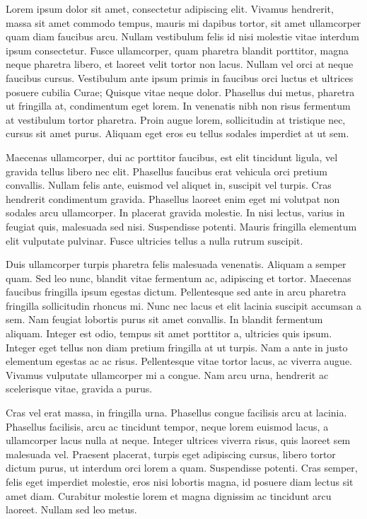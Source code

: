\documentclass[12pt,a4paper]{article}
\begin{document}
Lorem ipsum dolor sit amet, consectetur adipiscing elit. Vivamus
hendrerit, massa sit amet commodo tempus, mauris mi dapibus tortor,
sit amet ullamcorper quam diam faucibus arcu. Nullam vestibulum felis
id nisi molestie vitae interdum ipsum consectetur. Fusce ullamcorper,
quam pharetra blandit porttitor, magna neque pharetra libero, et
laoreet velit tortor non lacus. Nullam vel orci at neque faucibus
cursus. Vestibulum ante ipsum primis in faucibus orci luctus et
ultrices posuere cubilia Curae; Quisque vitae neque dolor. Phasellus
dui metus, pharetra ut fringilla at, condimentum eget lorem. In
venenatis nibh non risus fermentum at vestibulum tortor pharetra.
Proin augue lorem, sollicitudin at tristique nec, cursus sit amet
purus. Aliquam eget eros eu tellus sodales imperdiet at ut sem.


Maecenas ullamcorper, dui ac porttitor faucibus, est elit tincidunt
ligula, vel gravida tellus libero nec elit. Phasellus faucibus erat
vehicula orci pretium convallis. Nullam felis ante, euismod vel
aliquet in, suscipit vel turpis. Cras hendrerit condimentum gravida.
Phasellus laoreet enim eget mi volutpat non sodales arcu ullamcorper.
In placerat gravida molestie. In nisi lectus, varius in feugiat quis,
malesuada sed nisi. Suspendisse potenti. Mauris fringilla elementum
elit vulputate pulvinar. Fusce ultricies tellus a nulla rutrum
suscipit.


Duis ullamcorper turpis pharetra felis malesuada venenatis. Aliquam a
semper quam. Sed leo nunc, blandit vitae fermentum ac, adipiscing et
tortor. Maecenas faucibus fringilla ipsum egestas dictum.
Pellentesque sed ante in arcu pharetra fringilla sollicitudin rhoncus
mi. Nunc nec lacus et elit lacinia suscipit accumsan a sem. Nam
feugiat lobortis purus sit amet convallis. In blandit fermentum
aliquam. Integer est odio, tempus sit amet porttitor a, ultricies
quis ipsum. Integer eget tellus non diam pretium fringilla at ut
turpis. Nam a ante in justo elementum egestas ac ac risus.
Pellentesque vitae tortor lacus, ac viverra augue. Vivamus vulputate
ullamcorper mi a congue. Nam arcu urna, hendrerit ac scelerisque
vitae, gravida a purus.


Cras vel erat massa, in fringilla urna. Phasellus congue facilisis
arcu at lacinia. Phasellus facilisis, arcu ac tincidunt tempor, neque
lorem euismod lacus, a ullamcorper lacus nulla at neque. Integer
ultrices viverra risus, quis laoreet sem malesuada vel. Praesent
placerat, turpis eget adipiscing cursus, libero tortor dictum purus,
ut interdum orci lorem a quam. Suspendisse potenti. Cras semper,
felis eget imperdiet molestie, eros nisi lobortis magna, id posuere
diam lectus sit amet diam. Curabitur molestie lorem et magna
dignissim ac tincidunt arcu laoreet. Nullam sed leo metus.
\end{document}
